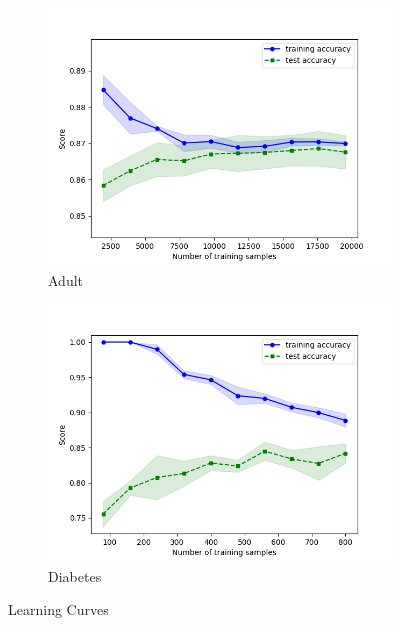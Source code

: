 \documentclass[11pt, twocolumn]{article}
\begin{document}
    \begin{figure}[!htbp]
        \begin{subfigure}{.24\textwidth}
            \centering
            \includegraphics[width=.9\textwidth]{learnings_Adult_Boosting_optimized}
            \caption{Adult}
            \label{fig:learnings_Adult_Boosting}
        \end{subfigure}
        \begin{subfigure}{.24\textwidth}
            \centering
            \includegraphics[width=.9\textwidth]{learnings_Diabetes_Boosting_optimized}
            \caption{Diabetes}
            \label{fig:learnings_Diabetes_Boosting}
        \end{subfigure}
        \caption{Learning Curves}
        \label{fig:learning_curves}
    \end{figure}
    \FloatBarrier
\end{document}

